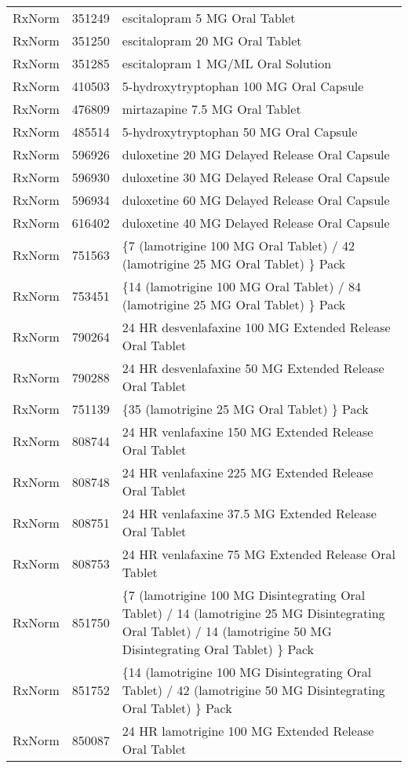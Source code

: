 \begin{longtable}{p{}p{}p{}}
  RxNorm & 351249 & escitalopram 5 MG Oral Tablet \\ 
  RxNorm & 351250 & escitalopram 20 MG Oral Tablet \\ 
  RxNorm & 351285 & escitalopram 1 MG/ML Oral Solution \\ 
  RxNorm & 410503 & 5-hydroxytryptophan 100 MG Oral Capsule \\ 
  RxNorm & 476809 & mirtazapine 7.5 MG Oral Tablet \\ 
  RxNorm & 485514 & 5-hydroxytryptophan 50 MG Oral Capsule \\ 
  RxNorm & 596926 & duloxetine 20 MG Delayed Release Oral Capsule \\ 
  RxNorm & 596930 & duloxetine 30 MG Delayed Release Oral Capsule \\ 
  RxNorm & 596934 & duloxetine 60 MG Delayed Release Oral Capsule \\ 
  RxNorm & 616402 & duloxetine 40 MG Delayed Release Oral Capsule \\ 
  RxNorm & 751563 & \{7 (lamotrigine 100 MG Oral Tablet) / 42 (lamotrigine 25 MG Oral Tablet) \} Pack \\ 
  RxNorm & 753451 & \{14 (lamotrigine 100 MG Oral Tablet) / 84 (lamotrigine 25 MG Oral Tablet) \} Pack \\ 
  RxNorm & 790264 & 24 HR desvenlafaxine 100 MG Extended Release Oral Tablet \\ 
  RxNorm & 790288 & 24 HR desvenlafaxine 50 MG Extended Release Oral Tablet \\ 
  RxNorm & 751139 & \{35 (lamotrigine 25 MG Oral Tablet) \} Pack \\ 
  RxNorm & 808744 & 24 HR venlafaxine 150 MG Extended Release Oral Tablet \\ 
  RxNorm & 808748 & 24 HR venlafaxine 225 MG Extended Release Oral Tablet \\ 
  RxNorm & 808751 & 24 HR venlafaxine 37.5 MG Extended Release Oral Tablet \\ 
  RxNorm & 808753 & 24 HR venlafaxine 75 MG Extended Release Oral Tablet \\ 
  RxNorm & 851750 & \{7 (lamotrigine 100 MG Disintegrating Oral Tablet) / 14 (lamotrigine 25 MG Disintegrating Oral Tablet) / 14 (lamotrigine 50 MG Disintegrating Oral Tablet) \} Pack \\ 
  RxNorm & 851752 & \{14 (lamotrigine 100 MG Disintegrating Oral Tablet) / 42 (lamotrigine 50 MG Disintegrating Oral Tablet) \} Pack \\ 
  RxNorm & 850087 & 24 HR lamotrigine 100 MG Extended Release Oral Tablet \\ 

\end{longtable}
